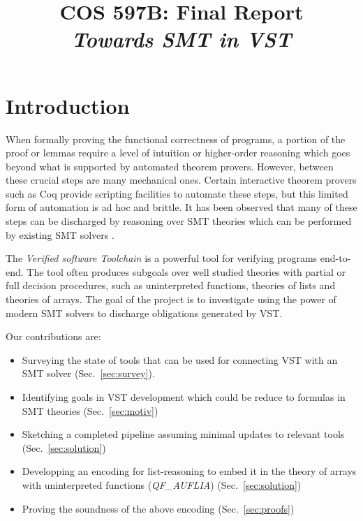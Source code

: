 \documentclass[onecolumn, preprint]{sigplanconf}
\title{COS 597B: Final Report\\
\emph{Towards SMT in VST}}
\begin{document}
\maketitle


\section{Introduction}
When formally proving the functional correctness of programs, a portion of the proof or lemmas require a level of intuition or higher-order reasoning which goes beyond what is supported by automated theorem provers. However, between these crucial steps are many mechanical ones. Certain interactive theorem provers such as Coq provide scripting facilities to automate these steps, but this limited form of automation is ad hoc and brittle. It has been observed that many of these steps can be discharged by reasoning over SMT theories which can be performed by existing SMT solvers \citep{appelnote}. 

The \emph{Verified software Toolchain} is a powerful tool for verifying programs end-to-end. %
The tool often produces subgoals over well studied theories with partial or full decision procedures, such as uninterpreted functions, theories of lists and theories of arrays. The goal of the project is to investigate using the power of modern SMT solvers to discharge obligations generated by VST.

Our contributions are:
\begin{itemize}
\item Surveying the state of tools that can be used for connecting VST with an SMT solver (Sec.~\ref{sec:survey}). %
 \item Identifying goals in VST development which could be reduce to formulas in SMT theories (Sec.~\ref{sec:motiv})
 \item Sketching a completed pipeline assuming minimal updates to relevant tools (Sec.~\ref{sec:solution})
 \item Developping an encoding for list-reasoning to embed it in the theory of arrays with uninterpreted functions (\emph{QF\_AUFLIA}) (Sec.~\ref{sec:solution})
 \item Proving the soundness of the above encoding (Sec.~\ref{sec:proofs})
\end{itemize}
\end{document}
